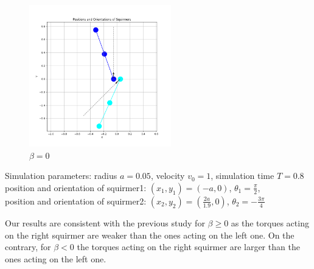 \documentclass{article}
\begin{document}
\begin{figure}[H]
\begin{minipage}{0.49\textwidth}
        \caption{\footnotesize $\beta = 3$}
    \end{minipage}
    \includegraphics[width=0.55\textwidth]{graphs/simulations/sim_sq_sq/beta0/m3pi_4_.png}
    \caption{\footnotesize $\beta = 0$}
\end{figure}
\begin{center}
    Simulation parameters: radius $a=0.05$, velocity $v_0=1$, simulation time $T=0.8$\\
        position and orientation of squirmer1: $(x_1,y_1)=(-a,0)$, $\theta_1=\frac{\pi}{2}$,\\
        position and orientation of squirmer2: $(x_2,y_2)=(\frac{2a}{1.9},0)$, $\theta_2=-\frac{3\pi}{4}$
\end{center}
Our results are consistent with the previous study\cite{Stark} for $\beta \ge 0$ as the torques acting on the right squirmer
are weaker than the ones acting on the left one. On the contrary, for $\beta < 0$ the torques acting on the right squirmer are larger
than the ones acting on the left one.
\end{document}
